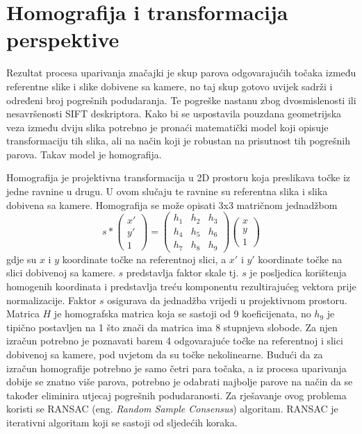 \section{Homografija i transformacija perspektive}

Rezultat procesa uparivanja značajki je skup parova odgovarajućih točaka između referentne slike i slike dobivene sa kamere, no taj skup gotovo uvijek sadrži i određeni broj pogrešnih podudaranja. Te pogreške nastanu zbog dvosmislenosti ili nesavršenosti SIFT deskriptora. Kako bi se uspostavila pouzdana geometrijska veza između dviju slika potrebno je pronaći matematički model koji opisuje transformaciju tih slika, ali na način koji je robustan na prisutnost tih pogrešnih parova. Takav model je homografija. 

Homografija je projektivna transformacija u 2D prostoru koja preslikava točke iz jedne ravnine u drugu. U ovom slučaju te ravnine su referentna slika i slika dobivena sa kamere. Homografija se može opisati 3x3 matričnom jednadžbom
\begin{equation}
    s *
    \begin{pmatrix}
        x' \\
        y' \\
        1
    \end{pmatrix}
    =
    \begin{pmatrix}
        h_1 & h_2 & h_3 \\
        h_4 & h_5 & h_6 \\
        h_7 & h_8 & h_9
    \end{pmatrix}
    \begin{pmatrix}
        x \\
        y \\
        1
    \end{pmatrix}
\end{equation}
gdje su $x$ i $y$ koordinate točke na referentnoj slici, a $x'$ i $y'$ koordinate točke na slici dobivenoj sa kamere. $s$ predstavlja faktor skale tj. $s$ je posljedica korištenja homogenih koordinata i predstavlja treću komponentu rezultirajućeg vektora prije normalizacije. Faktor $s$ osigurava da jednadžba vrijedi u projektivnom prostoru. Matrica $H$ je homografska matrica koja se sastoji od 9 koeficijenata, no $h_9$ je tipično postavljen na 1 što znači da matrica ima 8 stupnjeva slobode. Za njen izračun potrebno je poznavati barem 4 odgovarajuće točke na referentnoj i slici dobivenoj sa kamere, pod uvjetom da su točke nekolinearne.
Budući da za izračun homografije potrebno je samo četri para točaka, a iz procesa uparivanja dobije se znatno više parova, potrebno je odabrati najbolje parove na način da se također eliminira utjecaj pogrešnih podudaranosti. Za rješavanje ovog problema koristi se RANSAC (eng. \textit{Random Sample Consensus}) algoritam. RANSAC je iterativni algoritam koji se sastoji od sljedećih koraka. 
